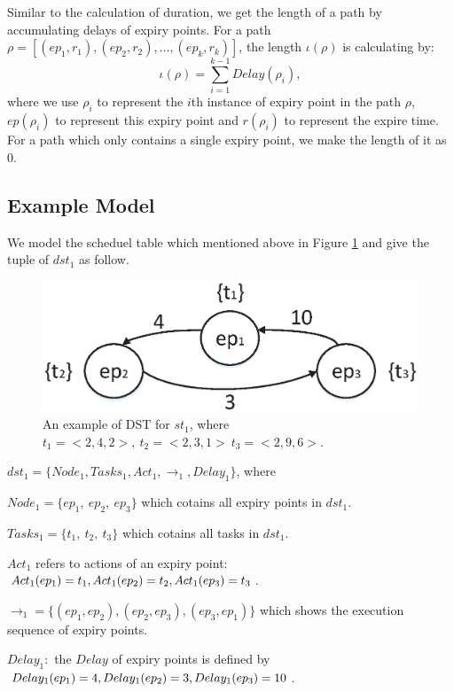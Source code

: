 \documentclass[sigconf]{acmart}
\begin{document}
Similar to the calculation of duration, we get the length of a path by accumulating delays of expiry points. For a path $\rho=[(ep_1,r_1),(ep_2,r_2),\dots,(ep_k,r_k)]$, the length $\iota(\rho)$ is calculating by: 
\[\iota(\rho)=\sum_{i=1}^{k-1} Delay(\rho_i),\]
where we use $\rho_i$ to represent the $i$th instance of expiry point in the path $\rho$, $ep(\rho_i)$ to represent this expiry point and $r(\rho_i)$ to represent the expire time. For a path which only contains a single expiry point, we make the length of it as 0. %


\subsection{Example Model}\label{section_dst_1}
We model the scheduel table which mentioned above in Figure \ref{figure_dst1} and give the tuple of $dst_1$ as follow.
\begin{figure}
  \centering
  \includegraphics[scale=.45]{graphics/figure_dst1.eps}
  \caption{An example of DST for $st_1$, where $t_1=<2,4,2>,\ t_2=<2,3,1>\ t_3=<2,9,6>$.}
  \label{figure_dst1}
\end{figure}

$dst_1=\{Node_1,Tasks_1,Act_1,\rightarrow_1,Delay_1\}$, where 
\begin{compactitem}
\item $Node_1=\{ep_1,\ ep_2,\ ep_3\}$ which cotains all expiry points in $dst_1$.
\item $Tasks_1=\{t_1,\ t_2,\ t_3\}$ which cotains all tasks in $dst_1$.
\item $Act_1$ refers to actions of an expiry point:$\\Act_1(ep_1)=t_1,\\Act_1(ep_2)=t_2,\\Act_1(ep_3)=t_3$.
\item $\rightarrow_1=\{(ep_1,ep_2),(ep_2,ep_3),(ep_3,ep_1)\}$ which shows the execution sequence of expiry points.
\item $Delay_1:$ the $Delay$ of expiry points is defined by $\\Delay_1(ep_1)=4,\\ Delay_1(ep_2)=3,\\ Delay_1(ep_3)=10$.
\end{compactitem}
\end{document}
